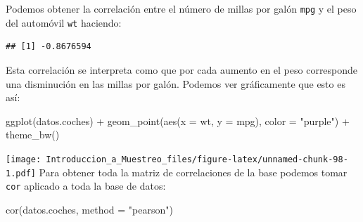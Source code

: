 \documentclass[
]{book}
\newenvironment{Shaded}{\begin{snugshade}}{\end{snugshade}}
\newcommand{\AttributeTok}[1]{\textcolor[rgb]{0.77,0.63,0.00}{#1}}
\newcommand{\FunctionTok}[1]{\textcolor[rgb]{0.00,0.00,0.00}{#1}}
\newcommand{\NormalTok}[1]{#1}
\newcommand{\SpecialCharTok}[1]{\textcolor[rgb]{0.00,0.00,0.00}{#1}}
\newcommand{\StringTok}[1]{\textcolor[rgb]{0.31,0.60,0.02}{#1}}
\begin{document}
Podemos obtener la correlación entre el número de millas por galón \texttt{mpg} y el peso del automóvil \texttt{wt} haciendo:

\begin{Shaded}
\end{Shaded}

\begin{verbatim}
## [1] -0.8676594
\end{verbatim}

Esta correlación se interpreta como que por cada aumento en el peso corresponde una disminución en las millas por galón. Podemos ver gráficamente que esto es así:

\begin{Shaded}
\begin{Highlighting}[]
\FunctionTok{ggplot}\NormalTok{(datos.coches) }\SpecialCharTok{+}
  \FunctionTok{geom\_point}\NormalTok{(}\FunctionTok{aes}\NormalTok{(}\AttributeTok{x =}\NormalTok{ wt, }\AttributeTok{y =}\NormalTok{ mpg), }\AttributeTok{color =} \StringTok{"purple"}\NormalTok{) }\SpecialCharTok{+}
  \FunctionTok{theme\_bw}\NormalTok{()}
\end{Highlighting}
\end{Shaded}

\texttt{[image: Introduccion\_a\_Muestreo\_files/figure-latex/unnamed-chunk-98-1.pdf]}
Para obtener toda la matriz de correlaciones de la base podemos tomar \texttt{cor} aplicado a toda la base de datos:

\begin{Shaded}
\begin{Highlighting}[]
\FunctionTok{cor}\NormalTok{(datos.coches, }\AttributeTok{method =} \StringTok{"pearson"}\NormalTok{)}
\end{Highlighting}
\end{Shaded}
\end{document}
